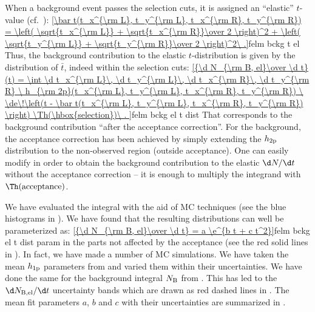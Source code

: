 When a background event passes the selection cuts, it is assigned an ``elastic'' $t$-value (cf.~):
\eqref{\bar t(t_x^{\rm L}, t_y^{\rm L}, t_x^{\rm R}, t_y^{\rm R})
= \left( \sqrt{t_x^{\rm L}} + \sqrt{t_x^{\rm R}}\over 2 \right)^2 + \left( \sqrt{t_y^{\rm L}} + \sqrt{t_y^{\rm R}}\over 2 \right)^2\ .}{felm bckg t el}
Thus, the background contribution to the elastic $t$-distribution is given by the distribution of $\bar t$, indeed within the selection cuts:
\eqref{{\d N_{\rm B, el}\over \d t}(t) = \int
	\d t_x^{\rm L}\, \d t_y^{\rm L}\, \d t_x^{\rm R}\, \d t_y^{\rm R}
	\ h_{\rm 2p}(t_x^{\rm L}, t_y^{\rm L}, t_x^{\rm R}, t_y^{\rm R})
	\ \de\!\left(t - \bar t(t_x^{\rm L}, t_y^{\rm L}, t_x^{\rm R}, t_y^{\rm R}) \right)
	\Th(\hbox{selection})\ .
}{felm bckg el t dist}
That corresponds to the background contribution ``after the acceptance correction''. For the background, the acceptance correction has been achieved by simply extending the $h_{\rm 2p}$ distribution to the non-observed region (outside acceptance). One can easily modify  in order to obtain the background contribution to the elastic $\d N/\d t$ without the acceptance correction -- it is enough to multiply the integrand with $\Th(\hbox{acceptance})$.

We have evaluated the integral  with the aid of MC techniques (see the blue histograms in ). We have found that the resulting distributions can well be parameterized as:
\eqref{{\d N_{\rm B, el}\over \d t} = a \e^{b t + c t^2}}{felm bckg el t dist param}
in the parts not affected by the acceptance (see the red solid lines in ). In fact, we have made a number of MC simulations. We have taken the mean $h_{\rm 1p}$ parameters from  and varied them within their uncertainties. We have done the same for the background integral $N_{\rm B}$ from . This has led to the $\d N_{\rm B,el}/\d t$ uncertainty bands which are drawn as red dashed lines in . The mean fit parameters $a$, $b$ and $c$ with their uncertainties are summarized in .




